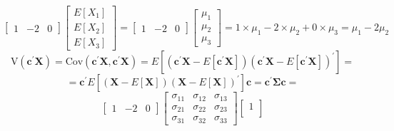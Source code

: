\begin{enumerate}[label=(\alph*)]
\[\begin{bmatrix}
                    1 & -2 & 0
                \end{bmatrix}                
                \begin{bmatrix}
                    E\left[X_1\right] \\
                    E\left[X_2\right] \\
                    E\left[X_3\right]
                \end{bmatrix}
                =
                \begin{bmatrix}
                    1 & -2 & 0
                \end{bmatrix}                
                \begin{bmatrix}
                    \mu_1 \\
                    \mu_2 \\
                    \mu_3
                \end{bmatrix}
                =
                1 \times \mu_1 -2 \times \mu_2 + 0 \times \mu_3
                =
                \mu_1 - 2 \mu_2
            \]
            \[
                \text{V}\left(\textbf{c}^\prime\textbf{X}\right)
                =
                \text{Cov}\left(\textbf{c}^\prime\textbf{X},\textbf{c}^\prime\textbf{X}\right)
                =
                E\left[\left(\textbf{c}^\prime\textbf{X} - E\left[\textbf{c}^\prime\textbf{X}\right]\right)\left(\textbf{c}^\prime\textbf{X} - E\left[\textbf{c}^\prime\textbf{X}\right]\right)^\prime\right]
                =
            \]
            \[
                =
                \textbf{c}^\prime E\left[\left(\textbf{X} - E\left[\textbf{X}\right]\right){\left(\textbf{X} - E\left[\textbf{X}\right]\right)}^\prime\right]\textbf{c}
                =
                \textbf{c}^\prime\mathbf{\Sigma}\textbf{c}
                =
            \]
            \[
                \begin{bmatrix}
                    1 & -2 & 0
                \end{bmatrix}
                \begin{bmatrix}
                    \sigma_{11} & \sigma_{12} & \sigma_{13} \\
                    \sigma_{21} & \sigma_{22} & \sigma_{23} \\
                    \sigma_{31} & \sigma_{32} & \sigma_{33}
                \end{bmatrix}
                \begin{bmatrix}
                    1 \\

\end{bmatrix}\]
\end{enumerate}
